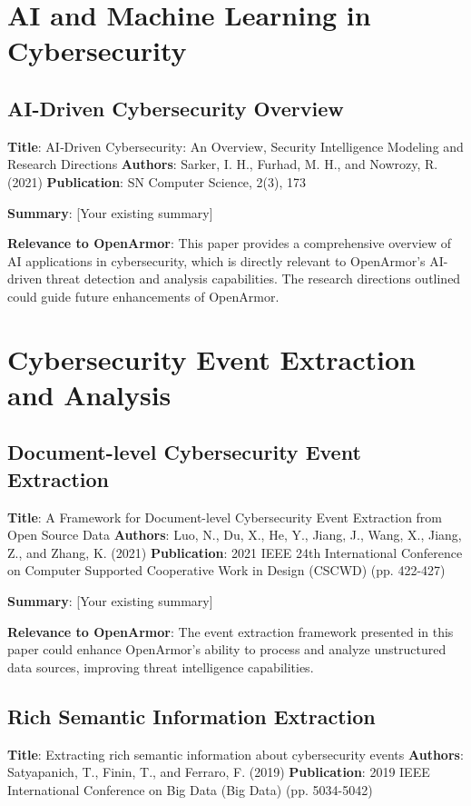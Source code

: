 \section{AI and Machine Learning in Cybersecurity}
\subsection{AI-Driven Cybersecurity Overview}
\textbf{Title}: AI‑Driven Cybersecurity: An Overview, Security Intelligence Modeling and Research Directions
\textbf{Authors}: Sarker, I. H., Furhad, M. H., and Nowrozy, R. (2021)
\textbf{Publication}: SN Computer Science, 2(3), 173

\textbf{Summary}: [Your existing summary]

\textbf{Relevance to OpenArmor}: This paper provides a comprehensive overview of AI applications in cybersecurity, which is directly relevant to OpenArmor's AI-driven threat detection and analysis capabilities. The research directions outlined could guide future enhancements of OpenArmor.

\section{Cybersecurity Event Extraction and Analysis}
\subsection{Document-level Cybersecurity Event Extraction}
\textbf{Title}: A Framework for Document-level Cybersecurity Event Extraction from Open Source Data
\textbf{Authors}: Luo, N., Du, X., He, Y., Jiang, J., Wang, X., Jiang, Z., and Zhang, K. (2021)
\textbf{Publication}: 2021 IEEE 24th International Conference on Computer Supported Cooperative Work in Design (CSCWD) (pp. 422-427)

\textbf{Summary}: [Your existing summary]

\textbf{Relevance to OpenArmor}: The event extraction framework presented in this paper could enhance OpenArmor's ability to process and analyze unstructured data sources, improving threat intelligence capabilities.

\subsection{Rich Semantic Information Extraction}
\textbf{Title}: Extracting rich semantic information about cybersecurity events
\textbf{Authors}: Satyapanich, T., Finin, T., and Ferraro, F. (2019)
\textbf{Publication}: 2019 IEEE International Conference on Big Data (Big Data) (pp. 5034-5042)


